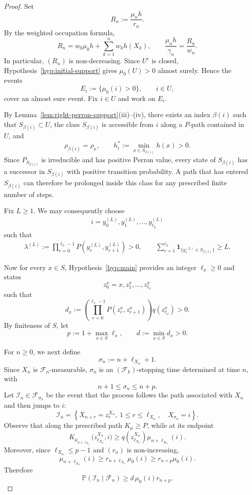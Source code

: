 \documentclass[10pt,a4paper]{amsart}
\begin{document}
\begin{proof}
Set
\[
R_n:=\frac{\mu_nh}{r_n}.
\]
By the weighted occupation formula,
\[
R_n
=
w_0\mu_0h+\sum_{k=1}^n w_kh(X_k),
\qquad
\frac{\mu_nh}{\gamma_n}
=
\frac{R_n}{w_n}.
\]
In particular, \((R_n)\) is non-decreasing. Since \(U^c\) is closed, Hypothesis~\ref{hyp:initial-support} gives
\(\mu_0(U)>0\) almost surely. Hence the events
\[
E_i:=\{\mu_0(i)>0\},
\qquad i\in U,
\]
cover an almost sure event. Fix \(i\in U\) and work on \(E_i\).


By Lemma~\ref{lem:right-perron-support}\textup{(iii)--(iv)}, there exists an
index \(\beta(i)\) such that \(S_{\beta(i)}\subset U\), the
class \(S_{\beta(i)}\) is accessible from \(i\) along a \(P\)-path contained
in \(U\), and
\[
\rho_{\beta(i)}=\rho_\kappa,
\qquad
h_i^*:=\min_{x\in S_{\beta(i)}}h(x)>0.
\]
Since \(P_{S_{\beta(i)}}\) is irreducible and has positive Perron value, every
state of \(S_{\beta(i)}\) has a successor in \(S_{\beta(i)}\) with positive
transition probability. A path that has entered \(S_{\beta(i)}\) can therefore
be prolonged inside this class for any prescribed finite number of steps.

Fix \(L\geq1\). We may consequently choose
\begin{align}\label{eq:i-path-L-visits}
    i=y_0^{(L)},y_1^{(L)},\ldots,y_{\ell_L}^{(L)}
\end{align}
such that
\begin{align}\label{eq:lambda^L-visits}
\lambda^{(L)}
:=
\prod_{r=0}^{\ell_L-1}
P(y_r^{(L)},y_{r+1}^{(L)})
>0,
\qquad
\sum_{r=1}^{\ell_L}
\mathbf 1_{\{y_r^{(L)}\in S_{\beta(i)}\}}
\geq L.
\end{align}


Now for every \(x\in S\), Hypothesis~\ref{hyp:main} provides an integer \(\ell_x\geq0\) and states
\[
z_0^x=x,z_1^x,\ldots,z_{\ell_x}^x
\]
such that
\[
d_x
:=
\left(
\prod_{r=0}^{\ell_x-1}
P(z_r^x,z_{r+1}^x)
\right)
q(z_{\ell_x}^x)
>0.
\]
By finiteness of \(S\), let
\[
p:=1+\max_{x\in S}\ell_x,
\qquad
d:=\min_{x\in S}d_x>0.
\]

For \(n\geq0\), we next define 
\[
\sigma_n:=n+\ell_{X_n}+1. 
\]
Since \(X_n\) is \(\mathcal F_n\)-measurable, \(\sigma_n\) is an
\((\mathcal F_k)\)-stopping time determined at time \(n\), with
\[
n+1\leq\sigma_n\leq n+p.
\]
Let \(\mathcal I_n\in\mathcal F_{\sigma_n}\) be the event that the process follows the path associated with \(X_n\) and then jumps to \(i\):
\[
\mathcal I_n
=
\left\{
X_{n+r}=z_r^{X_n},\ 1\leq r\leq\ell_{X_n},
\quad
X_{\sigma_n}=i
\right\}.
\]
Observe that along the prescribed path \(K_\mu\geq P\), while at its endpoint
\[
K_{\mu_{n+\ell_{X_n}}}
\bigl(z_{\ell_{X_n}}^{X_n},i\bigr)
\geq
q(z_{\ell_{X_n}}^{X_n})
\mu_{n+\ell_{X_n}}(i).
\]
Moreover, since \(\ell_{X_n}\leq p-1\) and \((r_n)\) is non-increasing,
\[
\mu_{n+\ell_{X_n}}(i)
\geq
r_{n+\ell_{X_n}}\mu_0(i)
\geq
r_{n+p}\mu_0(i).
\]
Therefore
\[
\mathbb P(\mathcal I_n\mid\mathcal F_n)
\geq
d\,\mu_0(i)r_{n+p}.
\]


\end{proof}
\end{document}
